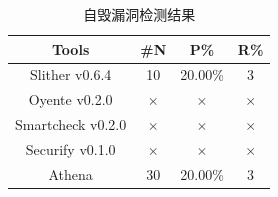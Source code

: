\begin{table}[htbp]
\begin{minipage}[t]{0.48\textwidth}
  \label{tab:eval_llc}%
  \end{minipage}
  \begin{minipage}[t]{0.48\textwidth}
    \caption{自毁漏洞检测结果}
    \begin{tabular}{cccc}
    \toprule
    Tools & \#N & P\% & R\% \\
    \midrule
    Slither v0.6.4 & 10    & 20.00\%    & 3 \\
    Oyente v0.2.0 & $\times$ & $\times$ & $\times$ \\
    Smartcheck v0.2.0 & $\times$ & $\times$ & $\times$ \\
    Securify v0.1.0 & $\times$  & $\times$ & $\times$ \\
    Athena & 30    & 20.00\%     & 3 \\
    \bottomrule
    \end{tabular}%
  \label{tab:eval_selfdestruct}%
  \end{minipage}
\end{table}%



